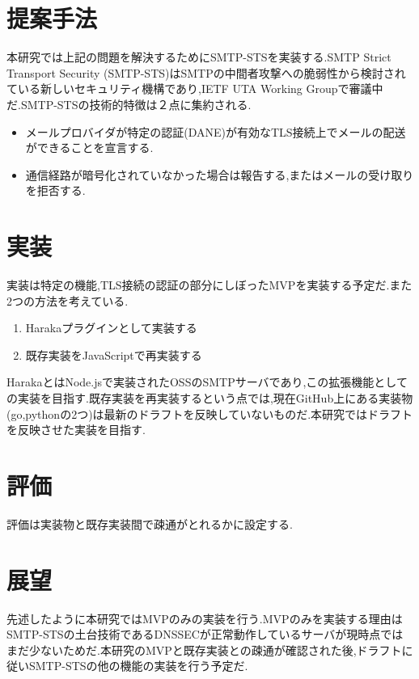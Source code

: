 \documentclass[a4j,10pt]{jsarticle}
\begin{document}
\section{提案手法}

本研究では上記の問題を解決するためにSMTP-STSを実装する.SMTP Strict Transport Security (SMTP-STS)はSMTPの中間者攻撃への脆弱性から検討されている新しいセキュリティ機構であり,IETF UTA Working Groupで審議中だ.\cite{draft}SMTP-STSの技術的特徴は２点に集約される.

\begin{itemize}
\item メールプロバイダが特定の認証(DANE)が有効なTLS接続上でメールの配送ができることを宣言する.
\item 通信経路が暗号化されていなかった場合は報告する,またはメールの受け取りを拒否する.
\end{itemize}

\section{実装}

実装は特定の機能,TLS接続の認証の部分にしぼったMVPを実装する予定だ.また2つの方法を考えている.

\begin{enumerate}
\item Harakaプラグインとして実装する
\item 既存実装をJavaScriptで再実装する
\end{enumerate}

HarakaとはNode.jsで実装されたOSSのSMTPサーバであり,この拡張機能としての実装を目指す.既存実装を再実装するという点では,現在GitHub上にある実装物(go,pythonの2つ)は最新のドラフトを反映していないものだ.本研究ではドラフトを反映させた実装を目指す.

\section{評価}

評価は実装物と既存実装間で疎通がとれるかに設定する.

\section{展望}

先述したように本研究ではMVPのみの実装を行う.MVPのみを実装する理由はSMTP-STSの土台技術であるDNSSECが正常動作しているサーバが現時点ではまだ少ないためだ.\cite{dnssec}本研究のMVPと既存実装との疎通が確認された後,ドラフトに従いSMTP-STSの他の機能の実装を行う予定だ.
\end{document}

